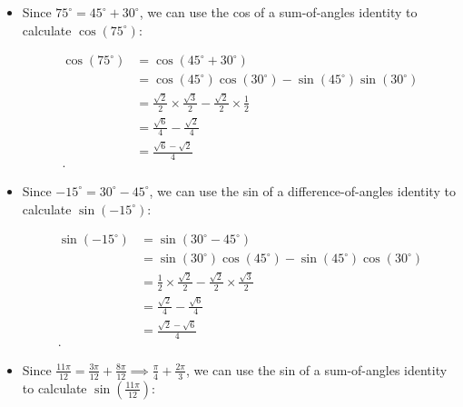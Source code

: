 \begin{solution}
  \label{sol:sum_of_angles}$ $

  \begin{itemize}
    \item Since $75^{\circ} = 45^{\circ} + 30^{\circ}$, we can use the cos of a
      sum-of-angles identity to calculate $\cos (75^{\circ})$:

      \begin{align*}
        \cos (75^{\circ}) &= \cos(45^{\circ} + 30^{\circ}) \\
                          &= \cos (45^{\circ})\cos (30^{\circ}) - \sin (45^{\circ})\sin (30^{\circ}) \\
                          &= \frac{\sqrt{2}}{2} \times \frac{\sqrt{3}}{2} - \frac{\sqrt{2}}{2} \times \frac{1}{2} \\
                          &= \frac{\sqrt{6}}{4} - \frac{\sqrt{2}}{4} \\
                          &= \frac{\sqrt{6} - \sqrt{2}}{4} \\
      .\end{align*}

    \item Since $-15^{\circ} = 30^{\circ} - 45^{\circ}$, we can use the sin of
      a difference-of-angles identity to calculate $\sin (-15^{\circ})$:

      \begin{align*}
        \sin (-15^{\circ}) &= \sin(30^{\circ} - 45^{\circ}) \\
                           &= \sin (30^{\circ})\cos (45^{\circ}) - \sin (45^{\circ})\cos (30^{\circ}) \\
                           &= \frac{1}{2} \times \frac{\sqrt{2}}{2} - \frac{\sqrt{2}}{2} \times \frac{\sqrt{3}}{2} \\
                           &= \frac{\sqrt{2}}{4} - \frac{\sqrt{6}}{4} \\
                           &= \frac{\sqrt{2} - \sqrt{6}}{4} \\
      .\end{align*}

    \item Since $\frac{11\pi}{12} = \frac{3\pi}{12} + \frac{8\pi}{12} \implies
      \frac{\pi}{4} + \frac{2\pi}{3}$, we can use the sin of a sum-of-angles
      identity to calculate $\sin (\frac{11\pi}{12})$:


\end{itemize}
\end{solution}
